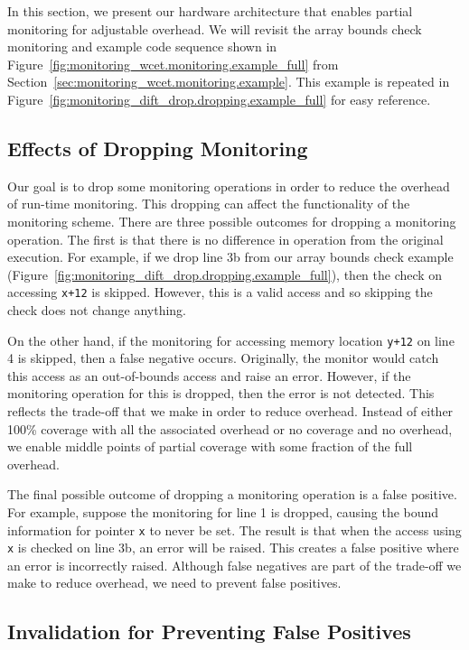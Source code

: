In this section, we present our hardware architecture that enables partial
monitoring for adjustable overhead. We will revisit the array bounds check
monitoring and example code sequence shown in
Figure~\ref{fig:monitoring_wcet.monitoring.example_full} from
Section~\ref{sec:monitoring_wcet.monitoring.example}. This example is repeated
in Figure~\ref{fig:monitoring_dift_drop.dropping.example_full} for easy
reference.

\subsection{Effects of Dropping Monitoring}
\label{sec:monitoring_dift_drop.dropping.false_neg_pos}

Our goal is to drop some monitoring operations in order to reduce the overhead
of run-time monitoring. This dropping can affect the functionality of the
monitoring scheme. There are three possible outcomes for dropping a monitoring
operation. The first is that there is no difference in operation from the
original execution. For example, if we drop line 3b from our array bounds check
example (Figure~\ref{fig:monitoring_dift_drop.dropping.example_full}), then the
check on accessing {\tt x+12} is skipped. However, this is a valid access and
so skipping the check does not change anything.

On the other hand, if the monitoring for accessing memory location {\tt y+12}
on line 4 is skipped, then a false negative occurs. Originally, the monitor
would catch this access as an out-of-bounds access and raise an error. However,
if the monitoring operation for this is dropped, then the error is not
detected. This reflects the trade-off that we make in order to reduce overhead.
Instead of either 100\% coverage with all the associated overhead or no
coverage and no overhead, we enable middle points of partial coverage with some
fraction of the full overhead.

The final possible outcome of dropping a monitoring operation is a false
positive.  For example, suppose the monitoring for line 1 is dropped, causing
the bound information for pointer {\tt x} to never be set. The result is that
when the access using {\tt x} is checked on line 3b, an error will be raised.
This creates a false positive where an error is incorrectly raised. Although
false negatives are part of the trade-off we make to reduce overhead, we need
to prevent false positives.

\subsection{Invalidation for Preventing False Positives}
\label{sec:monitoring_dift_drop.dropping.prevent_false_pos}

